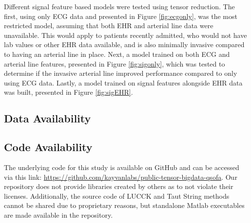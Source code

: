 Different signal feature based models were tested using tensor reduction. The first, using only ECG data and presented in Figure \ref{fig:ecgonly}, was the most restricted model, assuming that both EHR and arterial line data were unavailable. This would apply to patients recently admitted, who would not have lab values or other EHR data available, and is also minimally invasive compared to having an arterial line in place. Next, a model trained on both ECG and arterial line features, presented in Figure \ref{fig:sigonly}, which was tested to determine if the invasive arterial line improved performance compared to only using ECG data. Lastly, a model trained on signal features alongside EHR data was built, presented in Figure \ref{fig:sigEHR}.

\subsection*{Data Availability}


\subsection*{Code Availability}
The underlying code for this study is available on GitHub and can be accessed via this link: \url{https://github.com/kayvanlabs/public-tensor-bigdata-qsofa}. Our repository does not provide libraries created by others as to not violate their licenses. Additionally, the source code of LUCCK and Taut String methods cannot be shared due to proprietary reasons, but standalone Matlab executables are made available in the repository.